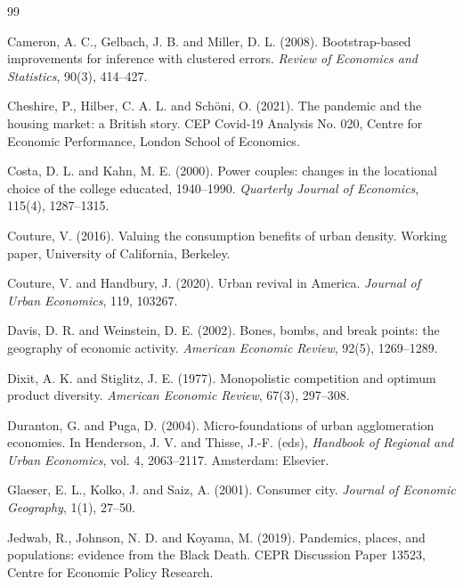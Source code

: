 \documentclass[11pt,a4paper]{article}
\begin{document}
\raggedright
\begin{thebibliography}{99}

Cameron, A. C., Gelbach, J. B. and Miller, D. L. (2008). Bootstrap-based improvements for inference with clustered errors. \textit{Review of Economics and Statistics}, 90(3), 414--427.

Cheshire, P., Hilber, C. A. L. and Sch{\"o}ni, O. (2021). The pandemic and the housing market: a British story. CEP Covid-19 Analysis No. 020, Centre for Economic Performance, London School of Economics.

Costa, D. L. and Kahn, M. E. (2000). Power couples: changes in the locational choice of the college educated, 1940--1990. \textit{Quarterly Journal of Economics}, 115(4), 1287--1315.

Couture, V. (2016). Valuing the consumption benefits of urban density. Working paper, University of California, Berkeley.

Couture, V. and Handbury, J. (2020). Urban revival in America. \textit{Journal of Urban Economics}, 119, 103267.

Davis, D. R. and Weinstein, D. E. (2002). Bones, bombs, and break points: the geography of economic activity. \textit{American Economic Review}, 92(5), 1269--1289.

Dixit, A. K. and Stiglitz, J. E. (1977). Monopolistic competition and optimum product diversity. \textit{American Economic Review}, 67(3), 297--308.

Duranton, G. and Puga, D. (2004). Micro-foundations of urban agglomeration economies. In Henderson, J. V. and Thisse, J.-F. (eds), \textit{Handbook of Regional and Urban Economics}, vol. 4, 2063--2117. Amsterdam: Elsevier.

Glaeser, E. L., Kolko, J. and Saiz, A. (2001). Consumer city. \textit{Journal of Economic Geography}, 1(1), 27--50.

Jedwab, R., Johnson, N. D. and Koyama, M. (2019). Pandemics, places, and populations: evidence from the Black Death. CEPR Discussion Paper 13523, Centre for Economic Policy Research.


\end{thebibliography}
\end{document}
